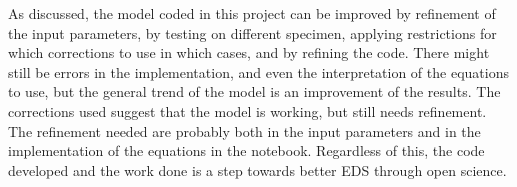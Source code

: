 As discussed, the model coded in this project can be improved by refinement of the input parameters, by testing on different specimen, applying restrictions for which corrections to use in which cases, and by refining the code.
There might still be errors in the implementation, and even the interpretation of the equations to use, but the general trend of the model is an improvement of the results.
The corrections used suggest that the model is working, but still needs refinement.
The refinement needed are probably both in the input parameters and in the implementation of the equations in the notebook.
Regardless of this, the code developed and the work done is a step towards better EDS through open science.












